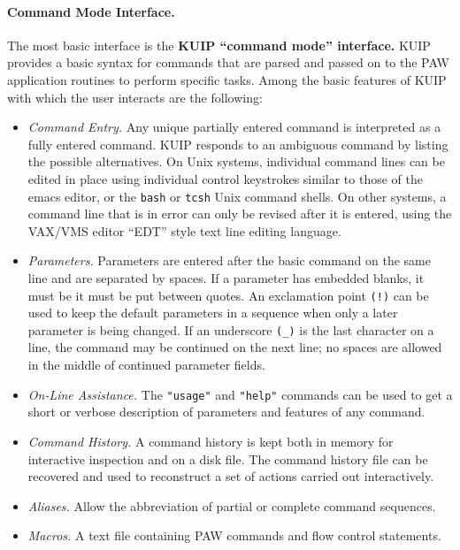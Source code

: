 \paragraph{Command Mode Interface.} The most basic interface is the 
{\bf KUIP ``command mode'' interface.}  KUIP provides a basic syntax for 
commands that are parsed and passed on to the PAW application routines to 
perform specific tasks. Among the basic features of KUIP with which the user 
interacts are the following:
 
\begin{itemize}
\item {\it Command Entry.\/}  
      Any unique partially entered command is interpreted as a fully entered 
      command.  KUIP responds to an ambiguous command by listing the possible 
      alternatives.  On Unix systems, individual command lines can be  edited 
      in place using individual control keystrokes similar to those of the 
      emacs editor, or the \texttt{bash} or \texttt{tcsh} Unix command shells.
      On other systems, a command line that is in error can only be revised 
      after it is entered, using the VAX/VMS editor ``EDT'' style text line 
      editing language.
\item {\it Parameters.\/}
      Parameters are entered after the basic command on the same line and are 
      separated by spaces. If a parameter has embedded blanks, it must be it 
      must be put between quotes.  An exclamation point \texttt{(!)} can be used
      to keep the default parameters in a sequence when only a later parameter
      is being changed.  If an underscore \texttt{(_)} is the last character on
      a line, the command may be continued on the next line; no spaces are
      allowed in the middle of continued parameter fields.
\item {\it On-Line Assistance.\/}  
      The \texttt{"usage"} and \texttt{"help"} commands can be used to get a 
      short or verbose description of  parameters and features of any command.
\item {\it Command History.\/}  
      A command history is kept both in memory for interactive inspection and on
      a disk file.  The command history file can be recovered and used to 
      reconstruct a set of actions carried out interactively.
\item {\it Aliases.\/} 
      Allow the abbreviation of partial or complete command sequences.
\item {\it Macros.\/} 
      A text file containing PAW commands and flow control statements.
\end{itemize}
 
